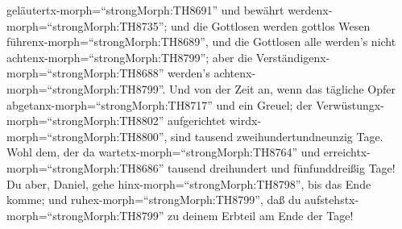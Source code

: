 geläutertx-morph=``strongMorph:TH8691'' und bewährt
werdenx-morph=``strongMorph:TH8735''; und die Gottlosen werden gottlos
Wesen führenx-morph=``strongMorph:TH8689'', und die Gottlosen alle
werden's nicht achtenx-morph=``strongMorph:TH8799''; aber die
Verständigenx-morph=``strongMorph:TH8688'' werden's
achtenx-morph=``strongMorph:TH8799''.  Und von der Zeit an,
wenn das tägliche Opfer abgetanx-morph=``strongMorph:TH8717'' und ein
Greuel; der Verwüstungx-morph=``strongMorph:TH8802'' aufgerichtet
wirdx-morph=``strongMorph:TH8800'', sind tausend zweihundertundneunzig
Tage.  Wohl dem, der da
wartetx-morph=``strongMorph:TH8764'' und
erreichtx-morph=``strongMorph:TH8686'' tausend dreihundert und
fünfunddreißig Tage!  Du aber, Daniel, gehe
hinx-morph=``strongMorph:TH8798'', bis das Ende komme; und
ruhex-morph=``strongMorph:TH8799'', daß du
aufstehstx-morph=``strongMorph:TH8799'' zu deinem Erbteil am Ende der
Tage!
